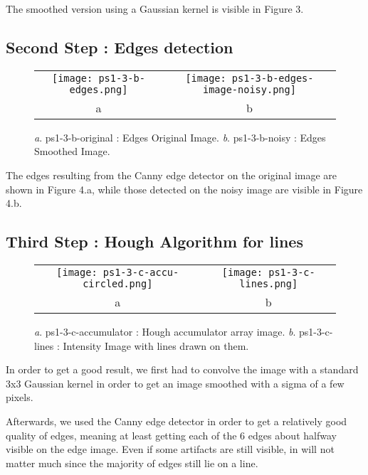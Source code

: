 \documentclass[a4paper,11pt]{article}
\begin{document}
The smoothed version using a Gaussian kernel is visible in Figure 3.


\subsection{Second Step : Edges detection}


 \begin{figure}[H]
\begin{center}
\begin{tabular}{cc}
\texttt{[image: ps1-3-b-edges.png]}&
\texttt{[image: ps1-3-b-edges-image-noisy.png]}\\
	a&b
\end{tabular}
\end{center}
 \caption{\textit{a}. ps1-3-b-original : Edges Original Image.  \textit{b}. ps1-3-b-noisy : Edges Smoothed Image. }
\label{ps1-3-b}
\end{figure}

The edges resulting from the Canny edge detector on the original image are shown in Figure 4.a, while those detected on the noisy image are visible in Figure 4.b.

\subsection{Third Step : Hough Algorithm for lines}

 \begin{figure}[H]
\begin{center}
\begin{tabular}{cc}
\texttt{[image: ps1-3-c-accu-circled.png]}&
\texttt{[image: ps1-3-c-lines.png]}\\
	a&b
\end{tabular}
\end{center}
 \caption{
\textit{a}. ps1-3-c-accumulator : Hough accumulator array image.  \textit{b}. ps1-3-c-lines : Intensity Image with lines drawn on them. }
\label{ps1-3-c}
\end{figure}

In order to get a good result, we first had to convolve the image with a standard 3x3 Gaussian kernel in order to get an image smoothed with a sigma of a few pixels.

Afterwards, we used the Canny edge detector in order to get a relatively good quality of edges, meaning at least getting each of the 6 edges about halfway visible on the edge image. Even if some artifacts are still visible, in will not matter much since the majority of edges still lie on a line.
\end{document}
